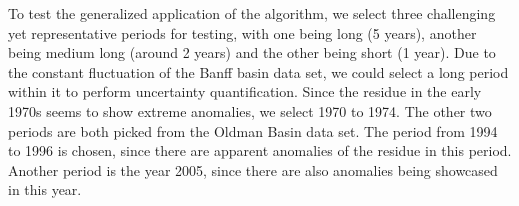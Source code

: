 To test the generalized application of the algorithm, we select three challenging yet representative periods for testing, with one being long (5 years), another being medium long (around 2 years) and the other being short (1 year). Due to the constant fluctuation of the Banff basin data set, we could select a long period within it to perform uncertainty quantification. Since the residue in the early 1970s seems to show extreme anomalies, we select 1970 to 1974. The other two periods are both picked from the Oldman Basin data set. The period from 1994 to 1996 is chosen, since there are apparent anomalies of the residue in this period. Another period is the year 2005, since there are also anomalies being showcased in this year.
